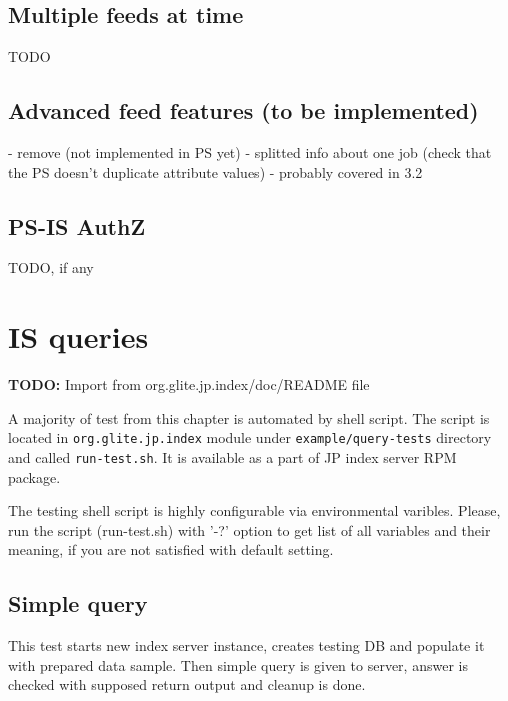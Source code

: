 \documentclass{egee}
\def\todo#1{\textbf{TODO:} #1}
\begin{document}
\subsection{Multiple feeds at time}
TODO

\subsection{Advanced feed features (to be implemented)}
- remove (not implemented in PS yet)
- splitted info about one job (check that the PS doesn't duplicate
  attribute values) - probably covered in 3.2


\subsection{PS-IS AuthZ}
TODO, if any

\section{IS queries}
\todo{Import from org.glite.jp.index/doc/README file}


%
%
%

A majority of test from this chapter is automated by shell
script. The script is located in \texttt{org.glite.jp.index} module
under \texttt{example/query-tests} directory and called \texttt{run-test.sh}.
It is available as a part of JP index server RPM package.

\begin{hints}
The testing shell script is highly configurable via
environmental varibles.  Please, run the script (run-test.sh) with
'-?' option to get list of all variables and their meaning, if you are
not satisfied with default setting.
\end{hints}

\subsection{Simple query}
This test starts new index server instance, creates testing DB
and populate it with prepared data sample. Then simple query is given
to server, answer is checked with supposed return output and
cleanup is done.
\end{document}
